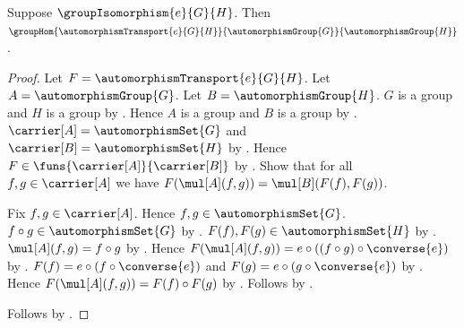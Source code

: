 \begin{theorem}\label{automorphism_transport_group_hom}
    Suppose $\groupIsomorphism{e}{G}{H}$.
    Then
        $\groupHom
            {\automorphismTransport{e}{G}{H}}
            {\automorphismGroup{G}}
            {\automorphismGroup{H}}$.
\end{theorem}
\begin{proof}
    Let $F=\automorphismTransport{e}{G}{H}$.
    Let $A=\automorphismGroup{G}$.
    Let $B=\automorphismGroup{H}$.
    $G$ is a group and $H$ is a group by
        .
    Hence $A$ is a group and $B$ is a group by
        .
    $\carrier[A]=\automorphismSet{G}$ and
        $\carrier[B]=\automorphismSet{H}$ by
        .
    Hence $F\in\funs{\carrier[A]}{\carrier[B]}$ by
        .
    Show that for all $f,g\in\carrier[A]$ we have
        $F(\mul[A](f,g))=\mul[B](F(f),F(g))$.
    \begin{subproof}
        Fix $f,g\in\carrier[A]$.
        Hence $f,g\in\automorphismSet{G}$.
        $f\circ g\in\automorphismSet{G}$ by
            .
        $F(f),F(g)\in\automorphismSet{H}$ by
            .
        $\mul[A](f,g)=f\circ g$ by
            .
        Hence $F(\mul[A](f,g))=e\circ((f\circ g)\circ\converse{e})$ by
            .
        $F(f)=e\circ(f\circ\converse{e})$ and
            $F(g)=e\circ(g\circ\converse{e})$ by
            .
        Hence $F(\mul[A](f,g))=F(f)\circ F(g)$ by
            .
        Follows by .
    \end{subproof}
    Follows by .
\end{proof}


